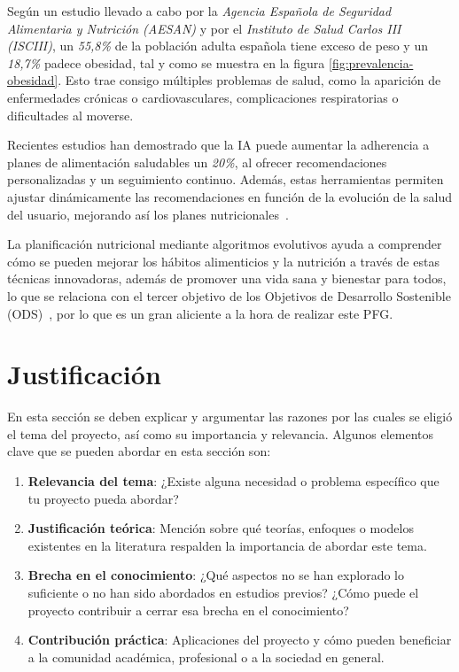 Según un estudio llevado a cabo por la \textit{Agencia Española de Seguridad Alimentaria y Nutrición (AESAN)} y por el \textit{Instituto de Salud Carlos III (ISCIII)}, un \textit{55,8\%} de la población adulta española tiene exceso de peso y un \textit{18,7\%} padece obesidad, tal y como se muestra en la figura \ref{fig:prevalencia-obesidad}. Esto trae consigo múltiples problemas de salud, como la aparición de enfermedades crónicas o cardiovasculares, complicaciones respiratorias o dificultades al moverse.

Recientes estudios han demostrado que la IA puede aumentar la adherencia a planes de alimentación saludables un \textit{20\%}, al ofrecer recomendaciones personalizadas y un seguimiento continuo. Además, estas herramientas permiten ajustar dinámicamente las recomendaciones en función de la evolución de la salud del usuario, mejorando así los planes nutricionales~\cite{oh2021systematic}.

La planificación nutricional mediante algoritmos evolutivos ayuda a comprender cómo se pueden mejorar los hábitos alimenticios y la nutrición a través de estas técnicas innovadoras, además de promover una vida sana y bienestar para todos, lo que se relaciona con el tercer objetivo de los Objetivos de Desarrollo Sostenible (ODS)~\cite{ONU2024}, por lo que es un gran aliciente a la hora de realizar este PFG.


\section{Justificación}

En esta sección se deben explicar y argumentar las razones por las cuales se eligió el tema del proyecto, así como su importancia y relevancia. Algunos elementos clave que se pueden abordar en esta sección son:

\begin{enumerate}
    \item \textbf{Relevancia del tema}: ¿Existe alguna necesidad o problema específico que tu proyecto pueda abordar?
    \item \textbf{Justificación teórica}: Mención sobre qué teorías, enfoques o modelos existentes en la literatura respalden la importancia de abordar este tema.
    \item \textbf{Brecha en el conocimiento}: ¿Qué aspectos no se han explorado lo suficiente o no han sido abordados en estudios previos? ¿Cómo puede el proyecto contribuir a cerrar esa brecha en el conocimiento?
    \item \textbf{Contribución práctica}: Aplicaciones del proyecto y cómo pueden beneficiar a la comunidad académica, profesional o a la sociedad en general.
\end{enumerate}

